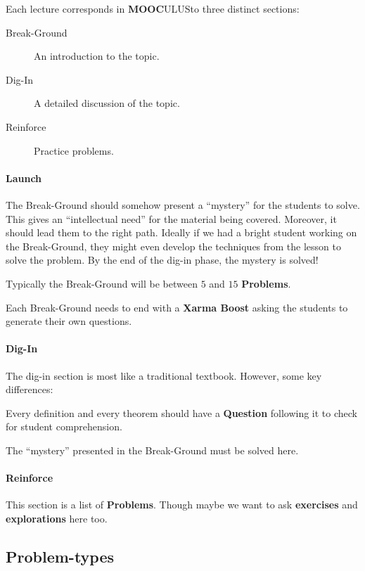 \documentclass{article}
\newcommand{\mooculus}{\textsf{\textbf{MOOC}\textnormal{\textsf{ULUS}}}}
\begin{document}
Each lecture corresponds in \mooculus to three distinct sections:
\begin{description}
\item[Break-Ground] An introduction to the topic.
\item[Dig-In] A detailed discussion of the topic.
\item[Reinforce] Practice problems.
\end{description}

\paragraph{Launch}

The Break-Ground should somehow present a ``mystery'' for the students
to solve.  This gives an ``intellectual need'' for the material being
covered. Moreover, it should lead them to the right path. Ideally if
we had a bright student working on the Break-Ground, they might even develop
the techniques from the lesson to solve the problem.  By the end of
the dig-in phase, the mystery is solved!

Typically the Break-Ground will be between $5$ and $15$ \textbf{Problems}.

Each Break-Ground needs to end with a \textbf{Xarma Boost} asking the
students to generate their own questions.


\paragraph{Dig-In}


The dig-in section is most like a traditional textbook. However, some key differences:


Every definition and every theorem should have a \textbf{Question}
following it to check for student comprehension.


The ``mystery'' presented in the Break-Ground must be solved here. 



\paragraph{Reinforce}

This section is a list of \textbf{Problems}. Though maybe we want to
ask \textbf{exercises} and \textbf{explorations} here too.



\subsection*{Problem-types}
\end{document}
